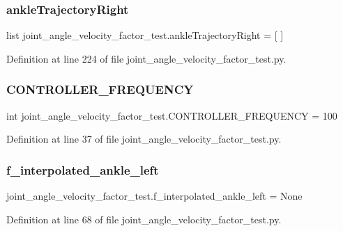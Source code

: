 \subsubsection{\texorpdfstring{ankleTrajectoryRight}{ankleTrajectoryRight}}
{\footnotesize\ttfamily list joint\+\_\+angle\+\_\+velocity\+\_\+factor\+\_\+test.\+ankle\+Trajectory\+Right = \mbox{[} \mbox{]}}



Definition at line 224 of file joint\+\_\+angle\+\_\+velocity\+\_\+factor\+\_\+test.\+py.

\mbox{\label{namespacejoint__angle__velocity__factor__test_a9e0228db87deaba7941c62938cc177e4}} 
\subsubsection{\texorpdfstring{CONTROLLER\_FREQUENCY}{CONTROLLER\_FREQUENCY}}
{\footnotesize\ttfamily int joint\+\_\+angle\+\_\+velocity\+\_\+factor\+\_\+test.\+C\+O\+N\+T\+R\+O\+L\+L\+E\+R\+\_\+\+F\+R\+E\+Q\+U\+E\+N\+CY = 100}



Definition at line 37 of file joint\+\_\+angle\+\_\+velocity\+\_\+factor\+\_\+test.\+py.

\mbox{\label{namespacejoint__angle__velocity__factor__test_afc03d55faf184cc20d04f88a22d0fd92}} 
\subsubsection{\texorpdfstring{f\_interpolated\_ankle\_left}{f\_interpolated\_ankle\_left}}
{\footnotesize\ttfamily joint\+\_\+angle\+\_\+velocity\+\_\+factor\+\_\+test.\+f\+\_\+interpolated\+\_\+ankle\+\_\+left = None}



Definition at line 68 of file joint\+\_\+angle\+\_\+velocity\+\_\+factor\+\_\+test.\+py.

